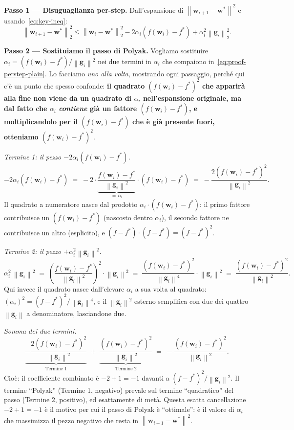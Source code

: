 \documentclass[11pt,a4paper]{article}
\newcommand{\norm}[1]{\left\|#1\right\|}
\newcommand{\bw}{\mathbf{w}}
\newcommand{\bg}{\mathbf{g}}
\theoremstyle{definition}
\begin{document}
\begin{tcolorbox}[proofbox]
\textbf{Passo 1 — Disuguaglianza per-step.} Dall'espansione di $\norm{\bw_{i+1}-\bw^*}^2$ e usando~\eqref{eq:key-ineq}:
\begin{equation}
\label{eq:proof-perstep-plain}
\norm{\bw_{i+1}-\bw^*}_2^2 \le \norm{\bw_i-\bw^*}_2^2 - 2\alpha_i(f(\bw_i)-f^*) + \alpha_i^2\norm{\bg_i}_2^2.
\end{equation}

\textbf{Passo 2 — Sostituiamo il passo di Polyak.} Vogliamo sostituire $\alpha_i = (f(\bw_i)-f^*)/\norm{\bg_i}^2$ nei due termini in $\alpha_i$ che compaiono in~\eqref{eq:proof-perstep-plain}. Lo facciamo \emph{uno alla volta}, mostrando ogni passaggio, perché qui c'è un punto che spesso confonde: \textbf{il quadrato $(f(\bw_i)-f^*)^2$ che apparirà alla fine non viene da un quadrato di $\alpha_i$ nell'espansione originale, ma dal fatto che $\alpha_i$ \emph{contiene} già un fattore $(f(\bw_i)-f^*)$, e moltiplicandolo per il $(f(\bw_i)-f^*)$ che è già presente fuori, otteniamo $(f(\bw_i)-f^*)^2$}.

\smallskip
\emph{Termine 1: il pezzo $-2\alpha_i(f(\bw_i)-f^*)$.}
\[
-2\alpha_i(f(\bw_i)-f^*) \;=\; -2\cdot\underbrace{\frac{f(\bw_i)-f^*}{\norm{\bg_i}^2}}_{=\,\alpha_i}\cdot(f(\bw_i)-f^*) \;=\; -\frac{2(f(\bw_i)-f^*)^2}{\norm{\bg_i}^2}.
\]
Il quadrato a numeratore nasce dal prodotto $\alpha_i\cdot(f(\bw_i)-f^*)$: il primo fattore contribuisce un $(f(\bw_i)-f^*)$ (nascosto dentro $\alpha_i$), il secondo fattore ne contribuisce un altro (esplicito), e $(f-f^*)\cdot(f-f^*) = (f-f^*)^2$.

\smallskip
\emph{Termine 2: il pezzo $+\alpha_i^2\norm{\bg_i}^2$.}
\[
\alpha_i^2\,\norm{\bg_i}^2 \;=\; \left(\frac{f(\bw_i)-f^*}{\norm{\bg_i}^2}\right)^2 \cdot \norm{\bg_i}^2 \;=\; \frac{(f(\bw_i)-f^*)^2}{\norm{\bg_i}^4}\cdot\norm{\bg_i}^2 \;=\; \frac{(f(\bw_i)-f^*)^2}{\norm{\bg_i}^2}.
\]
Qui invece il quadrato nasce dall'elevare $\alpha_i$ a sua volta al quadrato: $(\alpha_i)^2 = (f-f^*)^2/\norm{\bg_i}^4$, e il $\norm{\bg_i}^2$ esterno semplifica con due dei quattro $\norm{\bg_i}$ a denominatore, lasciandone due.

\smallskip
\emph{Somma dei due termini.}
\[
\underbrace{-\frac{2(f(\bw_i)-f^*)^2}{\norm{\bg_i}^2}}_{\text{Termine 1}} \;+\; \underbrace{\frac{(f(\bw_i)-f^*)^2}{\norm{\bg_i}^2}}_{\text{Termine 2}} \;=\; -\frac{(f(\bw_i)-f^*)^2}{\norm{\bg_i}^2}.
\]
Cioè: il coefficiente combinato è $-2 + 1 = -1$ davanti a $(f-f^*)^2/\norm{\bg_i}^2$. Il termine ``Polyak'' (Termine 1, negativo) prevale sul termine ``quadratico'' del passo (Termine 2, positivo), ed esattamente di metà. Questa esatta cancellazione $-2+1=-1$ è il motivo per cui il passo di Polyak è ``ottimale'': è il valore di $\alpha_i$ che massimizza il pezzo negativo che resta in $\norm{\bw_{i+1}-\bw^*}^2$.


\end{tcolorbox}
\end{document}
